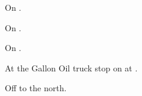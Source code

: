
\begin{LocationList}

On .

On  .

On  .

At the Gallon Oil truck stop on  at .

Off   to the north.

\end{LocationList}
